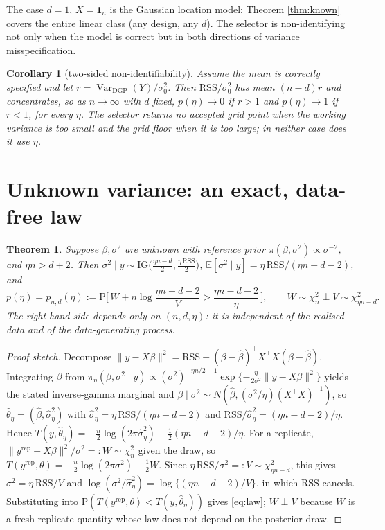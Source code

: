 \documentclass[11pt]{article}
\newtheorem{theorem}{Theorem}
\newtheorem{corollary}{Corollary}
\theoremstyle{remark}
\newcommand{\RSS}{\mathrm{RSS}}
\newcommand{\E}{\mathbb{E}}
\newcommand{\Prob}{\mathrm{P}}
\newcommand{\IG}{\mathrm{IG}}
\newcommand{\bbeta}{\beta}
\newcommand{\bhat}{\hat{\bbeta}}
\newcommand{\chisq}{\chi^2}
\DeclareMathOperator{\Var}{Var}
\begin{document}
The case $d=1$, $X=\mathbf 1_n$ is the Gaussian location model; Theorem \ref{thm:known} covers the entire linear
class (any design, any $d$). The selector is non-identifying not only when the model is correct but in both
directions of variance misspecification.

\begin{corollary}[two-sided non-identifiability]\label{cor:twosided}
Assume the mean is correctly specified and let $r=\Var_{\mathrm{DGP}}(Y)/\sigma_0^2$. Then $\RSS/\sigma_0^2$ has
mean $(n-d)r$ and concentrates, so as $n\to\infty$ with $d$ fixed, $p(\eta)\to 0$ if $r>1$ and $p(\eta)\to1$ if
$r<1$, for every $\eta$. The selector returns no accepted grid point when the working variance is too small and the grid floor
when it is too large; in neither case does it use $\eta$.
\end{corollary}

\section{Unknown variance: an exact, data-free law}
\begin{theorem}\label{thm:unknown}
Suppose $\bbeta,\sigma^2$ are unknown with reference prior $\pi(\bbeta,\sigma^2)\propto\sigma^{-2}$, and
$\eta n>d+2$. Then $\sigma^2\mid y\sim\IG\!\big(\tfrac{\eta n-d}{2},\tfrac{\eta\,\RSS}{2}\big)$,
$\E[\sigma^2\mid y]=\eta\,\RSS/(\eta n-d-2)$, and
\begin{equation}\label{eq:law}
p(\eta)=p_{n,d}(\eta):=\Prob\!\Big[\,W+n\log\frac{\eta n-d-2}{V}>\frac{\eta n-d-2}{\eta}\,\Big],
\qquad W\sim\chisq_n \perp V\sim\chisq_{\eta n-d}.
\end{equation}
The right-hand side depends only on $(n,d,\eta)$: it is independent of the realised data and of the
data-generating process.
\end{theorem}
\begin{proof}[Proof sketch]
Decompose $\lVert y-X\bbeta\rVert^2=\RSS+(\bbeta-\bhat)^\top X^\top X(\bbeta-\bhat)$. Integrating $\bbeta$ from
$\pi_\eta(\bbeta,\sigma^2\mid y)\propto(\sigma^2)^{-\eta n/2-1}\exp\{-\tfrac{\eta}{2\sigma^2}\lVert
y-X\bbeta\rVert^2\}$ yields the stated inverse-gamma marginal and $\bbeta\mid\sigma^2\sim N(\bhat,
(\sigma^2/\eta)(X^\top X)^{-1})$, so $\hat\theta_\eta=(\bhat,\hat\sigma^2_\eta)$ with
$\hat\sigma^2_\eta=\eta\,\RSS/(\eta n-d-2)$ and $\RSS/\hat\sigma^2_\eta=(\eta n-d-2)/\eta$. Hence
$T(y,\hat\theta_\eta)=-\tfrac n2\log(2\pi\hat\sigma^2_\eta)-\tfrac12(\eta n-d-2)/\eta$. For a replicate,
$\lVert y^{\mathrm{rep}}-X\bbeta\rVert^2/\sigma^2=:W\sim\chisq_n$ given the draw, so
$T(y^{\mathrm{rep}},\theta)=-\tfrac n2\log(2\pi\sigma^2)-\tfrac12 W$. Since
$\eta\,\RSS/\sigma^2=:V\sim\chisq_{\eta n-d}$, this gives $\sigma^2=\eta\,\RSS/V$ and
$\log(\sigma^2/\hat\sigma^2_\eta)=\log\{(\eta n-d-2)/V\}$, in which $\RSS$ cancels. Substituting into
$\Prob(T(y^{\mathrm{rep}},\theta)<T(y,\hat\theta_\eta))$ gives \eqref{eq:law}; $W\perp V$ because $W$ is a fresh
replicate quantity whose law does not depend on the posterior draw.
\end{proof}
\end{document}
